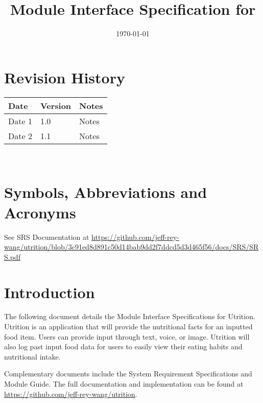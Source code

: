 \documentclass[12pt, titlepage]{article}
\begin{document}
\title{Module Interface Specification for \progname{}}

\author{\authname}

\date{\today}

\maketitle


\section{Revision History}

\begin{tabularx}{\textwidth}{p{3cm}p{2cm}X}
\toprule {\bf Date} & {\bf Version} & {\bf Notes}\\
\midrule
Date 1 & 1.0 & Notes\\
Date 2 & 1.1 & Notes\\
\bottomrule
\end{tabularx}

~\newpage

\section{Symbols, Abbreviations and Acronyms}

See SRS Documentation at \url{https://github.com/jeff-rey-wang/utrition/blob/3c91ed8d891c50d14bab9dd2f7ddcd5d3d465f56/docs/SRS/SRS.pdf}


\newpage

\tableofcontents

\newpage


\section{Introduction}

The following document details the Module Interface Specifications for Utrition. Utrition is an application that will provide the nutritional facts for an inputted food item. Users can provide input through text, voice, or image. Utrition will also log past input food data for users to easily view their eating habits and nutritional intake.

Complementary documents include the System Requirement Specifications
and Module Guide.  The full documentation and implementation can be
found at \url{https://github.com/jeff-rey-wang/utrition}.  
\end{document}
